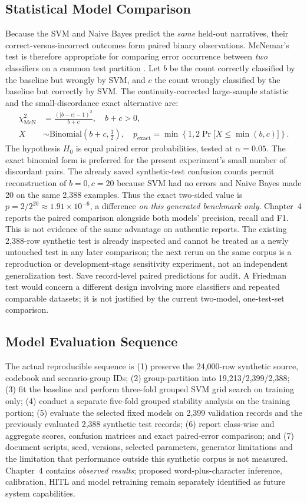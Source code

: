 \subsection{Statistical Model Comparison}
Because the SVM and Naive Bayes predict the \emph{same} held-out narratives, their correct-versus-incorrect outcomes form paired binary observations. McNemar's test is therefore appropriate for comparing error occurrence between \emph{two} classifiers on a common test partition \cite{mcnemar_nist}. Let $b$ be the count correctly classified by the baseline but wrongly by SVM, and $c$ the count wrongly classified by the baseline but correctly by SVM. The continuity-corrected large-sample statistic and the small-discordance exact alternative are:
\begin{align}
\chi^2_{\mathrm{McN}} &= \frac{(|b-c|-1)^2}{b+c},\quad b+c>0,\\
X&\sim\mathrm{Binomial}(b+c,\tfrac12),\quad
p_{\mathrm{exact}}=\min\!\left\{1,2\Pr\big[X\leq\min(b,c)\big]\right\}.
\end{align}
The hypothesis $H_0$ is equal paired error probabilities, tested at $\alpha=0.05$. The exact binomial form is preferred for the present experiment's small number of discordant pairs. The already saved synthetic-test confusion counts permit reconstruction of $b=0,c=20$ because SVM had no errors and Naive Bayes made 20 on the same 2,388 examples. Thus the exact two-sided value is $p=2/2^{20}\approx1.91\times10^{-6}$, a difference \emph{on this generated benchmark only}. Chapter~4 reports the paired comparison alongside both models' precision, recall and F1. This is not evidence of the same advantage on authentic reports. The existing 2,388-row synthetic test is already inspected and cannot be treated as a newly untouched test in any later comparison; the next rerun on the same corpus is a reproduction or development-stage sensitivity experiment, not an independent generalization test. Save record-level paired predictions for audit. A Friedman test would concern a different design involving more classifiers and repeated comparable datasets; it is not justified by the current two-model, one-test-set comparison.

\subsection{Model Evaluation Sequence}
The actual reproducible sequence is (1) preserve the 24,000-row synthetic source, codebook and scenario-group IDs; (2) group-partition into 19,213/2,399/2,388; (3) fit the baseline and perform three-fold grouped SVM grid search on training only; (4) conduct a separate five-fold grouped stability analysis on the training portion; (5) evaluate the selected fixed models on 2,399 validation records and the previously evaluated 2,388 synthetic test records; (6) report class-wise and aggregate scores, confusion matrices and exact paired-error comparison; and (7) document scripts, seed, versions, selected parameters, generator limitations and the limitation that performance outside this synthetic corpus is not measured. Chapter~4 contains \emph{observed results}; proposed word-plus-character inference, calibration, HITL and model retraining remain separately identified as future system capabilities.

